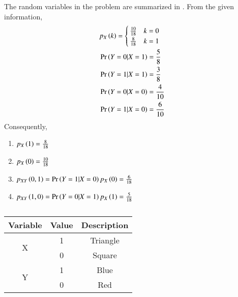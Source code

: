 The random variables in the problem are summarized in 
    .
    From
the given information,
\begin{align}
	&p_X\left(k\right)=
\begin{cases}
		\frac{10}{18} & k=0\\ 
		\frac{8}{18} & k=1
\end{cases}\\
&\Pr\left(Y=0|X=1\right)=\frac{5}{8}\\
&\Pr\left(Y=1|X=1\right)=\frac{3}{8}\\
&\Pr\left(Y=0|X=0\right)=\frac{4}{10}\\
&\Pr\left(Y=1|X=0\right)=\frac{6}{10}
\end{align}
Consequently,
\begin{enumerate}[itemsep=1ex]
\item $p_X\left(1\right)=\frac{8}{18}$
\item $p_X\left(0\right)=\frac{10}{18}$
\item $p_{XY}\left(0,1\right)=\Pr\left(Y=1|X=0\right)p_{X}\left(0\right)=\frac{6}{18}$
\item $p_{XY}\left(1,0\right)=\Pr\left(Y=0|X=1\right)p_{X}\left(1\right)=\frac{5}{18}$
\end{enumerate}
\begin{table}[ht]
    \centering
    \caption{}
    \label{table:random-variables}
%
    \begin{tabular}{|c|c|c|}
\hline
Variable & Value & Description       \\
\hline
\multirow{2}{*}{X} & 1     & Triangle          \\ 
\cline{2-3}
                   & 0     & Square            \\
\hline
\multirow{2}{*}{Y} & 1     & Blue \\ 
\cline{2-3}
                   & 0     & Red \\
\hline
\end{tabular}
%
\end{table}
